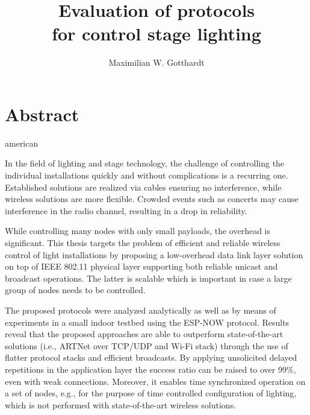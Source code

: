 \documentclass[]{ccs-thesis}
\author{Maximilian W. Gotthardt}
\title{Evaluation of protocols \\for control stage lighting}
\begin{document}

\maketitle

\thispagestyle{empty}

\cleardoublepage

\chapter*{Abstract}
\begin{otherlanguage*}{american}


In the field of lighting and stage technology, the challenge of controlling the individual installations 
quickly and without complications is a recurring one.
Established solutions are realized via cables ensuring no interference,
while wireless solutions are more flexible.
Crowded events such as concerts may cause interference in the radio channel, 
resulting in a drop in reliability.

While controlling many nodes with only small payloads, the overhead is significant.
This thesis targets the problem of efficient and reliable wireless control of light installations 
by proposing a low-overhead data link layer solution on top of IEEE 802.11 physical layer
supporting both reliable unicast and broadcast operations.
The latter is scalable which is important in case a large group of nodes needs to be controlled.

The proposed protocols were analyzed analytically 
as well as by means of experiments in a small indoor testbed using the ESP-NOW protocol. 
Results reveal that the proposed approaches are able to outperform state-of-the-art solutions 
(i.e., ARTNet over TCP/UDP and Wi-Fi stack) through the use of flatter protocol stacks and efficient broadcasts.
By applying unsolicited delayed repetitions in the application layer 
the success ratio can be raised to over 99\%, even with weak connections.
Moreover, it enables time synchronized operation on a set of nodes, e.g., 
for the purpose of time controlled configuration of lighting, 
which is not performed with state-of-the-art wireless solutions.

\end{otherlanguage*}
\end{document}
